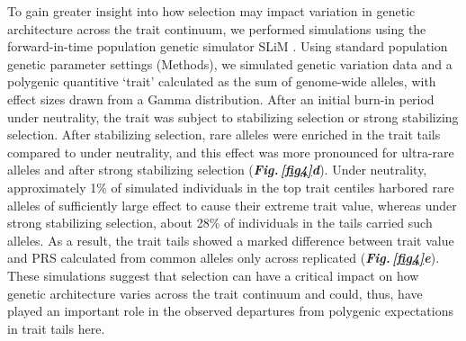 \documentclass[12pt]{zHenriquesLab-StyleBioRxiv}
\newcommand\dref[2]{\normalsize{\textbf{\textit{Fig.\,\ref{#1}#2}}}\normalsize{}}
\begin{document}
To gain greater insight into how selection may impact variation 
in genetic architecture across the trait continuum, we 
performed simulations using the forward-in-time population 
genetic simulator SLiM \cite{BC_2019}. Using standard population 
genetic parameter settings (Methods), we simulated genetic variation 
data and a polygenic quantitive ‘trait’ calculated as the sum of genome-wide alleles, 
with effect sizes drawn from a Gamma distribution. After an initial 
burn-in period under neutrality, the trait was subject to stabilizing selection or strong 
stabilizing selection. After stabilizing selection, rare alleles 
were enriched in the trait tails compared to under neutrality, 
and this effect was more pronounced for ultra-rare alleles and 
after strong stabilizing selection (\dref{fig4}{d}). Under 
neutrality, approximately 1\% of simulated individuals in the 
top trait centiles harbored rare alleles of sufficiently large 
effect to cause their extreme trait value, whereas under strong
stabilizing selection, about 28\% of individuals in the tails 
carried such alleles. As a result, the trait tails showed a marked 
difference between trait value and PRS calculated from common alleles 
only across replicated (\dref{fig4}{e}). These simulations 
suggest that selection can have a critical impact on how genetic 
architecture varies across the trait continuum and could, thus, 
have played an important role in the observed departures from 
polygenic expectations in trait tails here.
\end{document}
